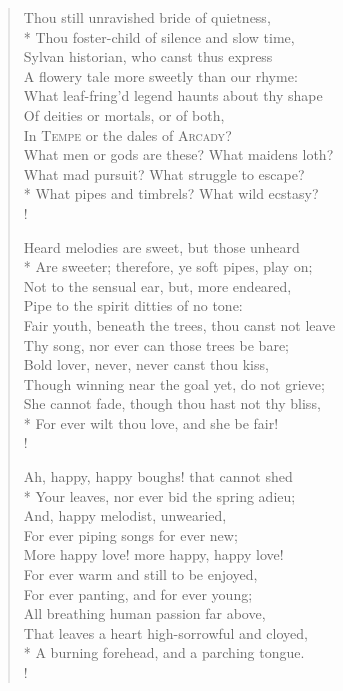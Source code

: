\begin{verse}
Thou still unravished bride of quietness,\\*
\vin Thou foster-child of silence and slow time,\\
Sylvan historian, who canst thus express\\
\vin A flowery tale more sweetly than our rhyme:\\
What leaf-fring'd legend haunts about thy shape\\
\vin Of deities or mortals, or of both,\\
\vin \vin In \textsc{Tempe} or the dales of \textsc{Arcady}?\\
\vin What men or gods are these? What maidens loth?\\
What mad pursuit? What struggle to escape?\\*
\vin \vin What pipes and timbrels? What wild ecstasy?\\!

Heard melodies are sweet, but those unheard\\*
\vin Are sweeter; therefore, ye soft pipes, play on;\\
Not to the sensual ear, but, more endeared,\\
\vin Pipe to the spirit ditties of no tone:\\
Fair youth, beneath the trees, thou canst not leave\\
\vin Thy song, nor ever can those trees be bare;\\
\vin \vin Bold lover, never, never canst thou kiss,\\
Though winning near the goal yet, do not grieve;\\
\vin She cannot fade, though thou hast not thy bliss,\\*
\vin \vin For ever wilt thou love, and she be fair!\\!

Ah, happy, happy boughs! that cannot shed\\*
\vin Your leaves, nor ever bid the spring adieu;\\
And, happy melodist, unwearied,\\
\vin For ever piping songs for ever new;\\
More happy love! more happy, happy love!\\
\vin For ever warm and still to be enjoyed,\\
\vin \vin For ever panting, and for ever young;\\
All breathing human passion far above,\\
\vin That leaves a heart high-sorrowful and cloyed,\\*
\vin \vin A burning forehead, and a parching tongue.\\!


\end{verse}
